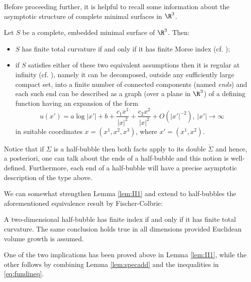         	 Before proceeding further, it is helpful to recall some information about the asymptotic structure of complete minimal surfaces in $\R^3$.
        	
        	\begin{rmk}\label{rem:reginf}
        		Let $S$ be a complete, embedded minimal surface of $\R^3$. Then:
        		\begin{itemize}
        			\item{$S$ has finite total curvature if and only if it has finite Morse index (cf. \cite{FC85});}
        			\item{if $S$ satisfies either of these two equivalent assumptions then it is regular at infinity (cf. \cite{Sc83}), namely it can be decomposed, outside any sufficiently large compact set, into a finite number of connected components (named \textsl{ends}) and each such end can be described as a graph (over a plane in $\R^3$) of a defining function having an expansion of the form
        				\[
        				u(x')=a\log|x'|+b+\frac{c_1 x^1}{|x|^2}+\frac{c_2 x^2}{|x|^2}+O(|x'|^{-2}), \ |x'|\longrightarrow\infty
        				\]
        				in suitable coordinates $x=(x^1,x^2,x^3)$, where $x'=(x^1,x^2)$.
        			}
        		\end{itemize}
        		Notice that if $\Sigma$ is a half-bubble then both facts apply to its double $\check{\Sigma}$ and hence, a posteriori, one can talk about the ends of a half-bubble and this notion is well-defined. Furthermore, each end of a half-bubble will have a precise asymptotic description of the type above.
        	\end{rmk}
        	
        		\begin{rmk}
        			We can somewhat strengthen Lemma \ref{lem:II1} and extend to half-bubbles the aforementioned equivalence result by Fischer-Colbrie:
        			\end{rmk}
        		\begin{prop}\label{pro:equiv}
        			A two-dimensional half-bubble has finite index if and only if it has finite total curvature.	The same conclusion holds true in all dimensions provided Euclidean volume growth is assumed.
        		\end{prop}
        		One of the two implications has been proved above in Lemma \ref{lem:II1}, while the other follows by combining Lemma \ref{lem:specadd} and the inequalities in \eqref{eq:fundineq}.
        	
        	\
        	
